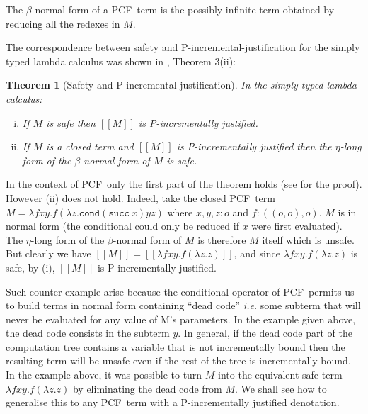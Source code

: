 \documentclass{article}
\newcommand{\sem}[1]{{[\![ #1 ]\!]}}
\newcommand\pcf{\textsf{PCF}}
\newcommand\pcfcond{\texttt{cond}}
\newcommand\pcfsucc{\texttt{succ}}
\newcommand\pcfpred{\texttt{pred}}
\newtheorem{theorem}{Theorem}[section]
\theoremstyle{remark}
\theoremstyle{definition}
\begin{document}
The $\beta$-normal form of a \pcf\ term is the possibly infinite term obtained by reducing all the redexes in $M$.



The correspondence between safety and P-incremental-justification for the simply typed lambda calculus was shown
in \cite{blumong:safelambdacalculus}, Theorem 3(ii):

\begin{theorem}[Safety and P-incremental justification]
\label{thm:safeincrejust} In the simply typed lambda calculus:
\begin{enumerate}[(i)]
\item If $M$ is safe then $\sem{M}$ is P-incrementally justified.
\item If $M$ is a closed term and $\sem{M}$ is
  P-incrementally justified then the $\eta$-long form of the
  $\beta$-normal form of $M$ is safe.
\end{enumerate}
\end{theorem}

In the context of \pcf\, only the first part of the theorem holds (see \cite{blumtransfer} for the proof). However (ii) does not hold. Indeed, take the closed \pcf\ term $M = \lambda f x y. f (\lambda z. \pcfcond (\pcfsucc\ x) y z )$ where $x,y,z:o$ and $f:((o,o),o)$. $M$ is in normal form (the conditional  could  only be reduced if $x$ were first evaluated). The $\eta$-long form of the $\beta$-normal form of $M$ is therefore $M$ itself which is unsafe.
But clearly we have $\sem{M} = \sem{\lambda f x y. f (\lambda z. z)}$, and since  $\lambda f x y. f (\lambda z. z)$ is safe, by (i), $\sem{M}$ is P-incrementally justified.

Such counter-example arise because the conditional operator
of \pcf\ permits us to build terms in normal form containing ``dead code'' {\it i.e.} some  subterm that will never be evaluated for any value of M's parameters. In the example given above, the dead code consists in the subterm $y$. In general, if the dead code part of the computation tree contains a variable that is not incrementally bound then the resulting term will be unsafe even if the rest of the tree is incrementally bound.
In the example above, it was possible to turn $M$ into the equivalent safe term $\lambda f x y. f (\lambda z. z)$ by eliminating the dead code from $M$.
We shall see how to generalise this to any \pcf\ term with a P-incrementally justified denotation.
\end{document}
